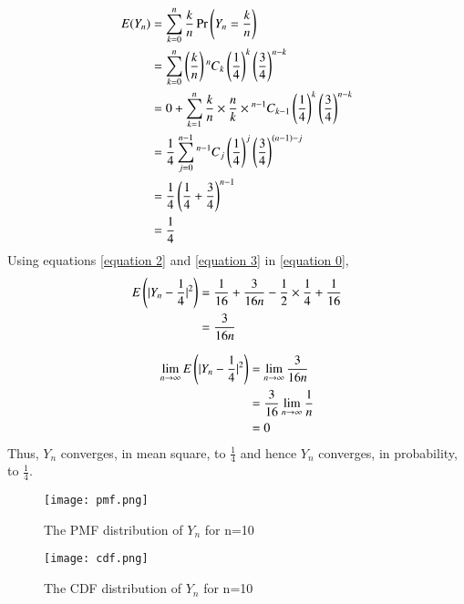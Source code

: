\documentclass[journal,12pt,twocolumn]{IEEEtran}
\begin{document}
\begin{align}
    E(Y_n) &= \sum_{k=0}^n\frac{k}{n}\Pr{\brak{Y_n=\frac{k}{n}}}
    \\&= \sum_{k=0}^{n} \brak{\frac{k}{n}}\comb[n]{k} \brak{\frac{1}{4}}^{k} \brak{\frac{3}{4}}^{n-k}
    \\&= 0 + \sum_{k=1}^{n} \frac{k}{n}\times\frac{n}{k}\times\comb[n-1]{k-1}\brak{\frac{1}{4}}^{k} \brak{\frac{3}{4}}^{n-k}
    \\&= \frac{1}{4}\sum_{j=0}^{n-1} \comb[n-1]{j}\brak{\frac{1}{4}}^{j} \brak{\frac{3}{4}}^{(n-1)-j}
    \\&= \frac{1}{4}\brak{\frac{1}{4} + \frac{3}{4}}^{n-1}
    \\&= \frac{1}{4} \label{equation 3}
\end{align}
Using equations \eqref{equation 2} and \eqref{equation 3} in \eqref{equation 0},
\begin{align}
    E\brak{\abs{Y_n-\frac{1}{4}}^2} &= \frac{1}{16}+ \frac{3}{16n}-\frac{1}{2}\times\frac{1}{4} + \frac{1}{16}
    \\&= \frac{3}{16n}
\end{align}

\begin{align}
    \lim_{n\rightarrow \infty} E\brak{\abs{Y_n-\frac{1}{4}}^2} &=  \lim_{n\rightarrow \infty}  \frac{3}{16n}
    \\&= \frac{3}{16}\lim_{n\rightarrow \infty}\frac{1}{n}
    \\&= 0
\end{align}
Thus, $Y_n$ converges, in mean square, to $\frac{1}{4}$ and hence $Y_n$ converges, in probability, to $\frac{1}{4}$.
 
\begin{figure} [H]
    \texttt{[image: pmf.png]}
    \caption{The PMF distribution of $Y_n$ for n=10}
    \label{Fig 1}
\end{figure}
\begin{figure} [H]
    \texttt{[image: cdf.png]}
    \caption{The CDF distribution of $Y_n$ for n=10}
    \label{Fig 2}
\end{figure}
\end{document}
